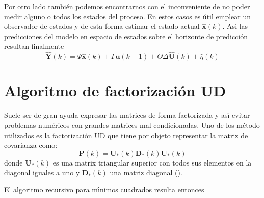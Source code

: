 Por otro lado tambi{\'e}n podemos encontrarnos con el inconveniente de no poder medir alguno o todos los estados
del proceso. En estos casos es {\'u}til emplear un observador de estados y de esta forma estimar el estado
actual $\mathbf{\hat{x}}(k)$. As{\'\i} las predicciones del modelo en espacio de estados sobre el horizonte de
predicci{\'o}n resultan finalmente
\begin{equation}
 \mathbf{\hat{Y}}(k)=\Psi \mathbf{\hat{x}}(k)+\Gamma \mathbf{u}(k-1)+\Theta \Delta\mathbf{\hat{U}}(k)
                     +\hat{\eta}(k)
\end{equation}


\section{Algoritmo de factorizaci{\'o}n UD}\label{A_4}
Suele ser de gran ayuda expresar las matrices de forma factorizada y as{\'\i} evitar problemas num{\'e}ricos con
grandes matrices mal condicionadas. Uno de los m{\'e}todo utilizados es la factorizaci{\'o}n UD que tiene por objeto
representar la matriz de covarianza como:
\begin{equation}
 \mathbf{P}(k)=\mathbf{U}_*(k)\mathbf{D}_*(k)\mathbf{U}_*(k)
\end{equation}
donde $\mathbf{U}_*(k)$ es una matrix triangular superior con todos sus elementos en la diagonal iguales a
uno y $\mathbf{D}_*(k)$ una matriz diagonal (\cite{Ll:99,ZyLx:99,JmBmZd:06,Jm:90}).

El algoritmo recursivo para m{\'\i}nimos cuadrados resulta entonces

